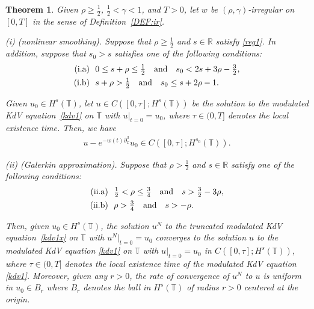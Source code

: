 \documentclass[letterpaper, 11pt,  reqno]{amsart}
\newtheorem{theorem}{Theorem} [section]
\newcommand{\1}{\hspace{0.5mm}\text{I}\hspace{0.5mm}}
\newcommand{\noi}{\noindent}
\newcommand{\R}{\mathbb{R}}
\newcommand{\T}{\mathbb{T}}
\newcommand{\g}{\gamma}
\newcommand{\dx}{\partial_x}
\numberwithin{equation}{section}
\numberwithin{theorem}{section}
\begin{document}
\begin{theorem}\label{THM:G1}
Given $\rho \ge\frac 12$,  $\frac12< \g < 1$, and $T> 0$, 
let  $w$ be $(\rho,\g)$-irregular on $[0, T]$ in the sense of Definition~\ref{DEF:ir}.


\smallskip

\noi
\textup{(i) (nonlinear smoothing).}
Suppose that $\rho \ge \frac 12$ and $s\in \R$
satisfy 
 \eqref{reg1}.
In addition, 
suppose that $s_0 > s$ satisfies 
 one of the following conditions\textup{:}
\begin{align}
\begin{split}
\textup{(i.a)} &\ \  
0 \le s + \rho \le  \tfrac 12
 \quad \text{and} \quad 
s_0 < 2s +  3\rho - \tfrac 32, \\
\textup{(i.b)} &\ \  
s + \rho >  \tfrac 12 
\quad  \text{and} \quad s_0 \le s + 2\rho - 1.
\end{split}
\label{reg3}
\end{align}




\noi
Given $u_0 \in H^s(\T)$, 
let $u
\in C([0, \tau]; H^s(\T))$ be the  solution 
to the modulated KdV equation~\eqref{kdv1}
on $\T$
with $u|_{t = 0} = u_0$, 
where 
$\tau \in (0,  T]$ denotes the local existence time.
Then, we have 
\begin{align*}
 u - e^{-w(t) \dx^3}u_0 \in C([0, \tau]; H^{s_0}(\T)).
\end{align*}



\smallskip

\noi
\textup{(ii) (Galerkin approximation).}
Suppose that $\rho> \frac 12$ and $s\in \R$
satisfy one of the following conditions\textup{:}
\begin{align}
\begin{split}
\textup{(ii.a)} &\ \  \tfrac 12 < \rho \le  \tfrac 34 \quad \text{and} \quad 
s > \tfrac 32 - 3 \rho, \\
\textup{(ii.b)} &\ \  \rho > \tfrac 34\quad  \text{and} \quad  s > - \rho.
\end{split}
\label{reg3a}
\end{align}

\noi
Then, given $u_0 \in H^s(\T)$, 
the solution $u^N$ to the truncated modulated KdV equation~\eqref{kdv1x}
on $\T$
with $u^N|_{t = 0} = u_0$
converges to the solution $u$
to the modulated KdV equation \eqref{kdv1}
on $\T$ with $u|_{t = 0} = u_0$
in $C([0, \tau]; H^s(\T))$, 
where $\tau \in (0, T]$ denotes the local existence time of the modulated KdV equation
\eqref{kdv1}.
Moreover, 
given any $r > 0$, 
the rate of convergence of $u^N$ to $u$ is
uniform in $u_0 \in B_r$ 
where
$B_r$ denotes the ball 
in $H^s(\T)$
of radius $r > 0$ centered at the origin.



\end{theorem}
\end{document}
